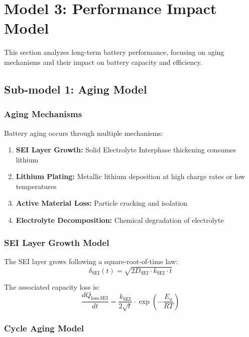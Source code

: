 \section{Model 3: Performance Impact Model}

This section analyzes long-term battery performance, focusing on aging mechanisms and their impact on battery capacity and efficiency.

\subsection{Sub-model 1: Aging Model}

\subsubsection{Aging Mechanisms}

Battery aging occurs through multiple mechanisms:

\begin{enumerate}
    \item \textbf{SEI Layer Growth:} Solid Electrolyte Interphase thickening consumes lithium
    \item \textbf{Lithium Plating:} Metallic lithium deposition at high charge rates or low temperatures
    \item \textbf{Active Material Loss:} Particle cracking and isolation
    \item \textbf{Electrolyte Decomposition:} Chemical degradation of electrolyte
\end{enumerate}

\subsubsection{SEI Layer Growth Model}

The SEI layer grows following a square-root-of-time law:
\begin{equation}
\delta_{\text{SEI}}(t) = \sqrt{2 D_{\text{SEI}} \cdot k_{\text{SEI}} \cdot t}
\label{eq:sei_thickness}
\end{equation}

The associated capacity loss is:
\begin{equation}
\frac{dQ_{\text{loss,SEI}}}{dt} = \frac{k_{\text{SEI}}}{2\sqrt{t}} \cdot \exp\left(-\frac{E_a}{RT}\right)
\label{eq:sei_capacity_loss}
\end{equation}

\subsubsection{Cycle Aging Model}

